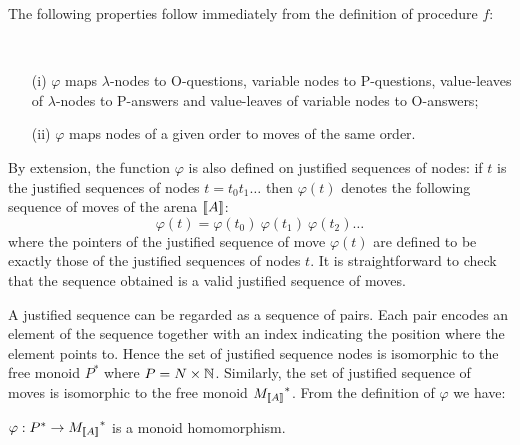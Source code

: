 The following properties follow immediately from the definition of procedure $f$:
\begin{property} \
\label{proper:phi_conserve_order}
\begin{itemize}
\item[(i)] $\varphi$ maps $\lambda$-nodes to O-questions, variable nodes to
P-questions, value-leaves of $\lambda$-nodes to P-answers and
value-leaves of variable nodes to O-answers;
\item[(ii)] $\varphi$ maps nodes of a given order to moves of the same order.
\end{itemize}
\end{property}


By extension, the function $\varphi$ is also defined on justified
sequences of nodes: if $t$ is the justified sequences of nodes $t =
t_0 t_1 \ldots$ then $\varphi(t)$ denotes the following sequence of
moves of the arena ${[\![ A ]\!]}$:
$$\varphi(t) = \varphi(t_0)\ \varphi(t_1)\  \varphi(t_2) \ldots$$
where the pointers of the justified sequence of move $\varphi(t)$
are defined to be exactly those of the justified sequences of nodes
$t$. It is straightforward to check that the sequence obtained is a
valid justified sequence of moves.


A justified sequence can be regarded as a sequence of pairs. Each pair encodes an element of the sequence together
with an index indicating the position where the element points to. Hence the set of justified sequence nodes is isomorphic
to the free monoid $P^*$ where $P = N \times \mathbb{N}$. Similarly, the set of justified sequence of moves is isomorphic to
the free monoid ${M_{{[\![ A ]\!]}}}^*$. From the definition of $\varphi$ we have:
\begin{lem}
\label{lem:varphi_monoidhomom}
$\varphi : P^* \rightarrow {M_{{[\![A ]\!]}}}^*$ is a monoid homomorphism.
\end{lem}


